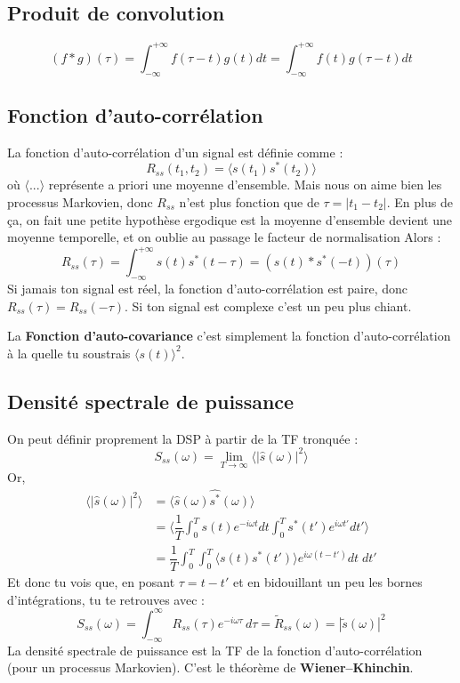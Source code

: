\documentclass[a4paper]{report}
\begin{document}
  \subsection{Produit de convolution}
  \begin{equation}
  (f*g)(\tau)=\int_{-\infty}^{+\infty} f(\tau-t) g(t) dt = \int_{-\infty}^{+\infty} f(t) g(\tau-t) dt
  \end{equation}
  \subsection{Fonction d'auto-corrélation}
  La fonction d'auto-corrélation d'un signal est définie comme :
  \begin{equation}
  R_{ss}(t_1,t_2)=\langle s(t_1)s^*(t_2)\rangle
  \end{equation}
  où $\langle ...\rangle$ représente a priori une moyenne d'ensemble.
  Mais nous on aime bien les processus Markovien, donc $R_{ss}$ n'est plus fonction que de $\tau=|t_1-t_2|$. En plus de ça, on fait une petite hypothèse ergodique est la moyenne d'ensemble devient une moyenne temporelle, et on oublie au passage le facteur de normalisation Alors :
  \begin{equation}
  R_{ss}(\tau)=\int_{-\infty}^{+\infty} s(t) s^*(t-\tau)= (s(t)*s^*(-t))(\tau)
  \end{equation}
  Si jamais ton signal est réel, la fonction d'auto-corrélation est paire, donc $R_{ss}(\tau)=R_{ss}(-\tau)$. Si ton signal est complexe c'est un peu plus chiant.
  
  La \textbf{Fonction d'auto-covariance} c'est simplement la fonction d'auto-corrélation à la quelle tu soustrais $\langle s(t)\rangle ^2$.
  \subsection{Densité spectrale de puissance}
  On peut définir proprement la DSP à partir de la TF tronquée : 
  \begin{equation}
  S_{ss}(\omega)=\lim_{T \to \infty} \langle |\hat{s}(\omega)|^2 \rangle
  \end{equation}
 Or, \begin{align*}
 \langle |\hat{s}(\omega)|^2 \rangle &=\langle \hat{s}(\omega)\hat{s^*}(\omega) \rangle \\
 &=\langle \dfrac{1}{T} \int_{0}^{T} s(t) e^{-i\omega t} dt \int_{0}^{T} s^*(t') e^{i\omega t'} dt' \rangle\\
 &=\dfrac{1}{T} \int_{0}^{T} \int_{0}^{T}\langle s(t)s^*(t') \rangle e^{i\omega(t-t')} dt\; dt'
 \end{align*}
 Et donc tu vois que, en posant $\tau=t-t'$ et en bidouillant un peu les bornes d'intégrations, tu te retrouves avec :
 \begin{equation}
 S_{ss}(\omega)=\int_{-\infty}^\infty R_{ss}(\tau) e^{-i\omega\tau}\,d \tau=\tilde R_{ss}(\omega)=|\tilde s (\omega)|^2
 \end{equation}
 La densité spectrale de puissance est la TF de la fonction d'auto-corrélation (pour un processus Markovien). C'est le théorème de \textbf{Wiener–Khinchin}.
 
\end{document}
